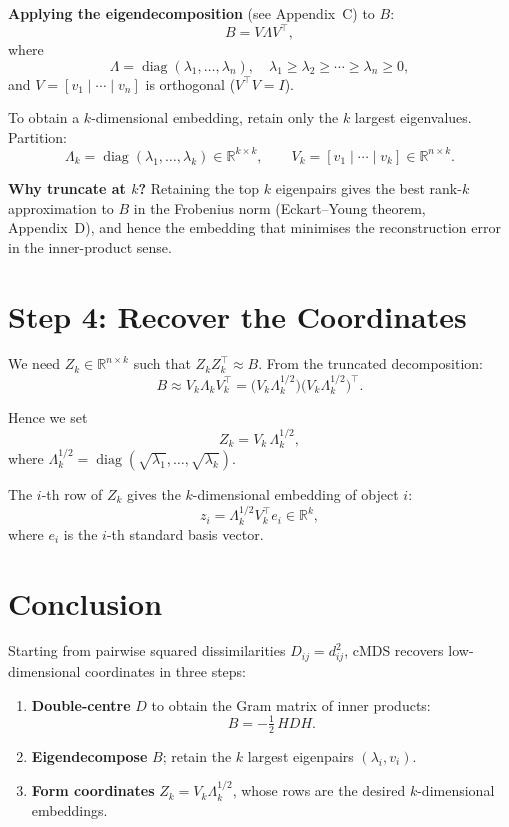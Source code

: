 \documentclass[11pt]{article}
\begin{document}
\textbf{Applying the eigendecomposition} (see Appendix~C) to $B$:
\[
  B = V \Lambda V^{\top},
\]
where
\[
  \Lambda = \operatorname{diag}(\lambda_1,\dots,\lambda_n),
  \quad \lambda_1 \ge \lambda_2 \ge \cdots \ge \lambda_n \ge 0,
\]
and $V = [v_1 \mid \cdots \mid v_n]$ is orthogonal ($V^{\top}V = I$).

To obtain a $k$-dimensional embedding, retain only the $k$ largest
eigenvalues.  Partition:
\[
  \Lambda_k = \operatorname{diag}(\lambda_1,\dots,\lambda_k) \in
  \mathbb{R}^{k\times k},
  \qquad
  V_k = [v_1 \mid \cdots \mid v_k] \in \mathbb{R}^{n\times k}.
\]

\textbf{Why truncate at $k$?}  Retaining the top $k$ eigenpairs gives the
best rank-$k$ approximation to $B$ in the Frobenius norm
(Eckart–Young theorem, Appendix~D), and hence the embedding that
minimises the reconstruction error in the inner-product sense.

\section*{Step 4: Recover the Coordinates}

We need $Z_k \in \mathbb{R}^{n\times k}$ such that
$Z_k Z_k^{\top} \approx B$.  From the truncated decomposition:
\[
  B \approx V_k \Lambda_k V_k^{\top}
          = \bigl(V_k \Lambda_k^{1/2}\bigr)
            \bigl(V_k \Lambda_k^{1/2}\bigr)^{\top}.
\]

Hence we set
\[
  \boxed{Z_k = V_k\,\Lambda_k^{1/2},}   \tag{7}
\]
where $\Lambda_k^{1/2} = \operatorname{diag}(\sqrt{\lambda_1},\dots,
\sqrt{\lambda_k})$.

The $i$-th row of $Z_k$ gives the $k$-dimensional embedding of object $i$:
\[
  z_i = \Lambda_k^{1/2} V_k^{\top} e_i \in \mathbb{R}^k,
\]
where $e_i$ is the $i$-th standard basis vector.

\section*{Conclusion}

Starting from pairwise squared dissimilarities $D_{ij} = d_{ij}^2$, cMDS
recovers low-dimensional coordinates in three steps:

\begin{enumerate}
  \item \textbf{Double-centre} $D$ to obtain the Gram matrix of inner
        products:
        \[B = -\tfrac{1}{2}\,HDH.\]
  \item \textbf{Eigendecompose} $B$; retain the $k$ largest eigenpairs
        $(\lambda_i, v_i)$.
  \item \textbf{Form coordinates}
        $Z_k = V_k \Lambda_k^{1/2}$,
        whose rows are the desired $k$-dimensional embeddings.
\end{enumerate}
\end{document}
